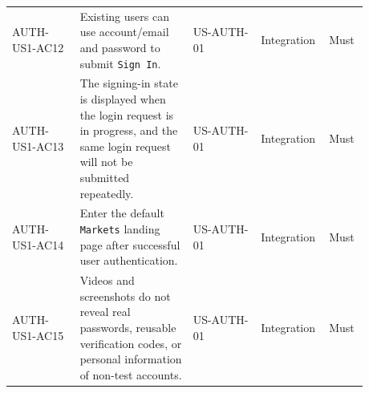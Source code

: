\begin{longtable}{L{0.18\linewidth}L{0.30\linewidth}L{0.18\linewidth}L{0.12\linewidth}L{0.10\linewidth}}
AUTH-US1-AC12 & Existing users can use account/\allowbreak{}email and password to submit \texttt{Sign In}. & US-AUTH-01 & Integration & Must \\
AUTH-US1-AC13 & The signing-in state is displayed when the login request is in progress, and the same login request will not be submitted repeatedly. & US-AUTH-01 & Integration & Must \\
AUTH-US1-AC14 & Enter the default \texttt{Markets} landing page after successful user authentication. & US-AUTH-01 & Integration & Must \\
AUTH-US1-AC15 & Videos and screenshots do not reveal real passwords, reusable verification codes, or personal information of non-test accounts. & US-AUTH-01 & Integration & Must \\
\bottomrule
\end{longtable}
\endgroup
